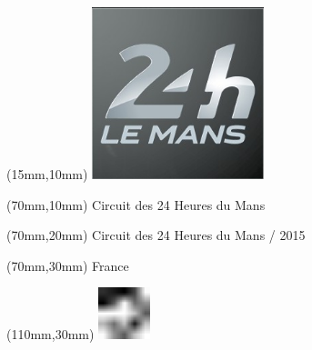\null\newpage
\begin{textblock*}{50mm}(15mm,10mm)%
\includegraphics[width=50mm]{LG/2015-05-20_00084.png}
\end{textblock*}
\begin{textblock*}{130mm}(70mm,10mm)%
{\fontsize{20}{20}\selectfont Circuit des 24 Heures du Mans}\\
\end{textblock*}
\begin{textblock*}{120mm}(70mm,20mm)%
{\fontsize{16}{16}\selectfont Circuit des 24 Heures du Mans / 2015}\\
\end{textblock*}
\begin{textblock*}{120mm}(70mm,30mm)%
{\fontsize{12}{12}\selectfont France}
\end{textblock*}
\begin{textblock*}{30mm}(110mm,30mm)%
\centering
\includegraphics[height=15mm]{icons/fa-rotate-left.pdf}
\end{textblock*}
